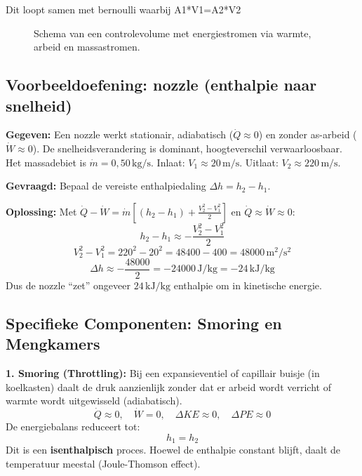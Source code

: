 \documentclass[a4paper,11pt,twoside]{report}
\newcommand{\term}[1]{\textbf{#1}}
\begin{document}
Dit loopt samen met bernoulli waarbij
A1*V1=A2*V2

\begin{figure}[H]
    \centering
    \caption{Schema van een controlevolume met energiestromen via warmte, arbeid en massastromen.}
\end{figure}

\subsection*{Voorbeeldoefening: nozzle (enthalpie naar snelheid)}
        	\textbf{Gegeven:} Een nozzle werkt stationair, adiabatisch ($\dot{Q}\approx 0$) en zonder as-arbeid ($\dot{W}\approx 0$). De snelheidsverandering is dominant, hoogteverschil verwaarloosbaar. Het massadebiet is $\dot{m}=0{,}50\,\mathrm{kg/s}$. Inlaat: $V_1\approx 20\,\mathrm{m/s}$. Uitlaat: $V_2\approx 220\,\mathrm{m/s}$.

        	\textbf{Gevraagd:} Bepaal de vereiste enthalpiedaling $\Delta h=h_2-h_1$.

        	\textbf{Oplossing:}
Met $\dot{Q}-\dot{W}=\dot{m}\left[(h_2-h_1)+\frac{V_2^2-V_1^2}{2}\right]$ en $\dot{Q}\approx\dot{W}\approx 0$:
\[
h_2-h_1\approx -\frac{V_2^2-V_1^2}{2}
\]
\[
V_2^2-V_1^2=220^2-20^2=48400-400=48000\,\mathrm{m^2/s^2}
\]
\[
\Delta h\approx -\frac{48000}{2}=-24000\,\mathrm{J/kg}=-24\,\mathrm{kJ/kg}
\]
Dus de nozzle “zet” ongeveer $\boxed{24\,\mathrm{kJ/kg}}$ enthalpie om in kinetische energie.

\subsection{Specifieke Componenten: Smoring en Mengkamers}
\textbf{1. Smoring (Throttling):}
Bij een expansieventiel of capillair buisje (in koelkasten) daalt de druk aanzienlijk zonder dat er arbeid wordt verricht of warmte wordt uitgewisseld (adiabatisch).
\[
\dot{Q} \approx 0, \quad \dot{W} = 0, \quad \Delta KE \approx 0, \quad \Delta PE \approx 0
\]
De energiebalans reduceert tot:
\[
h_1 = h_2
\]
Dit is een \term{isenthalpisch} proces. Hoewel de enthalpie constant blijft, daalt de temperatuur meestal (Joule-Thomson effect).
\end{document}
